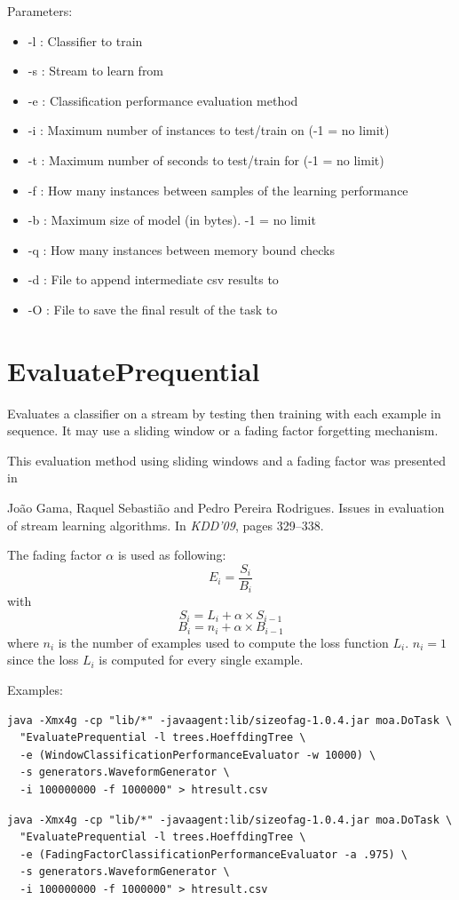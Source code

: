 \documentclass[a4paper,12pt,twoside]{book}
\begin{document}
Parameters:
\begin{itemize}
\item -l : Classifier to train
\item -s : Stream to learn from
\item -e : Classification performance evaluation method
\item -i : Maximum number of instances to test/train on  (-1 = no limit)
\item -t : Maximum number of seconds to test/train for (-1 = no limit)
\item -f : How many instances between samples of the learning performance
\item -b : Maximum size of model (in bytes). -1 = no limit
\item -q : How many instances between memory bound checks
\item -d : File to append intermediate csv results to
\item -O : File to save the final result of the task to
\end{itemize}



\section{EvaluatePrequential}
 Evaluates a classifier on a stream by testing then training with each example in sequence.
It may use a sliding window or a fading factor forgetting mechanism.

This evaluation method using sliding windows and a fading factor was presented in

\begin{itemize}
Jo{\~a}o Gama, Raquel Sebasti{\~a}o and Pedro Pereira Rodrigues.
\newblock Issues in evaluation of stream learning algorithms.
\newblock In {\em KDD'09}, pages 329--338.\end{itemize}

The fading factor $\alpha$ is used as following:
$$E_i = \frac{S_i} {B_i}$$
with
 $$S_i = L_i + \alpha \times S_{i-1}$$ $$B_i = n_i + \alpha \times B_{i-1}$$
where $n_i$ is the number of examples used to compute the loss function $L_i$.
$n_i = 1$ since the loss $L_i$ is computed for every single example.


Examples:
\begin{footnotesize}\begin{verbatim}
java -Xmx4g -cp "lib/*" -javaagent:lib/sizeofag-1.0.4.jar moa.DoTask \
  "EvaluatePrequential -l trees.HoeffdingTree \
  -e (WindowClassificationPerformanceEvaluator -w 10000) \
  -s generators.WaveformGenerator \
  -i 100000000 -f 1000000" > htresult.csv
\end{verbatim}
\begin{verbatim}
java -Xmx4g -cp "lib/*" -javaagent:lib/sizeofag-1.0.4.jar moa.DoTask \
  "EvaluatePrequential -l trees.HoeffdingTree \
  -e (FadingFactorClassificationPerformanceEvaluator -a .975) \
  -s generators.WaveformGenerator \
  -i 100000000 -f 1000000" > htresult.csv
\end{verbatim}

\end{footnotesize}
\end{document}
